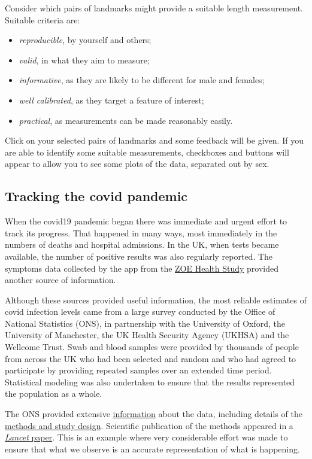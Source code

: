 \documentclass[
]{book}
\providecommand{\tightlist}{%
  \setlength{\itemsep}{0pt}\setlength{\parskip}{0pt}}
\begin{document}
Consider which pairs of landmarks might provide a suitable length measurement. Suitable criteria are:

\begin{itemize}
\tightlist
\item
  \emph{reproducible}, by yourself and others;
\item
  \emph{valid}, in what they aim to measure;
\item
  \emph{informative}, as they are likely to be different for male and females;
\item
  \emph{well calibrated}, as they target a feature of interest;
\item
  \emph{practical}, as measurements can be made reasonably easily.
\end{itemize}

Click on your selected pairs of landmarks and some feedback will be given. If you are able to identify some suitable measurements, checkboxes and buttons will appear to allow you to see some plots of the data, separated out by sex.

\subsection{Tracking the covid pandemic}\label{tracking-the-covid-pandemic}

When the covid19 pandemic began there was immediate and urgent effort to track its progress. That happened in many ways, most immediately in the numbers of deaths and hospital admissions. In the UK, when tests became available, the number of positive results was also regularly reported. The symptoms data collected by the app from the \href{https://health-study.zoe.com/data}{ZOE Health Study} provided another source of information.

Although these sources provided useful information, the most reliable estimates of covid infection levels came from a large survey conducted by the Office of National Statistics (ONS), in partnership with the University of Oxford, the University of Manchester, the UK Health Security Agency (UKHSA) and the Wellcome Trust. Swab and blood samples were provided by thousands of people from across the UK who had been selected and random and who had agreed to participate by providing repeated samples over an extended time period. Statistical modeling was also undertaken to ensure that the results represented the population as a whole.

The ONS provided extensive \href{https://www.ons.gov.uk/peoplepopulationandcommunity/healthandsocialcare/conditionsanddiseases/bulletins/coronaviruscovid19infectionsurveypilot/24march2023}{information} about the data, including details of the \href{https://www.ons.gov.uk/peoplepopulationandcommunity/healthandsocialcare/conditionsanddiseases/methodologies/covid19infectionsurveypilotmethodsandfurtherinformation}{methods and study design}. Scientific publication of the methods appeared in a \href{https://doi.org/10.1016/S2468-2667(20)30282-6}{\emph{Lancet} paper}. This is an example where very considerable effort was made to ensure that what we observe is an accurate representation of what is happening.
\end{document}

